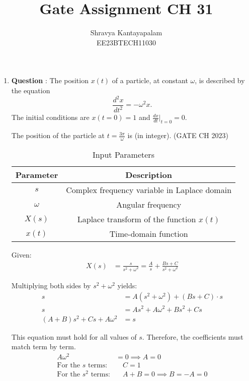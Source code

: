 \documentclass[journal,12pt,twocolumn]{IEEEtran}
\theoremstyle{remark}
\begin{document}
\title{Gate Assignment CH 31}
\author{Shravya Kantayapalam\\ EE23BTECH11030}
\maketitle

\begin{enumerate}
    \item \textbf{Question }:
The position \( x(t) \) of a particle, at constant \( \omega \), is described by the equation
\[
\frac{{d^2x}}{{dt^2}} = -\omega^2 x.
\]
The initial conditions are \( x(t=0) = 1 \) and \( \frac{{dx}}{{dt}}\bigg|_{t=0} = 0 \). 

The position of the particle at \( t = \frac{{3\pi}}{{\omega}} \) is \underline{\hspace{2cm}} (in integer).
\hfill{(GATE CH 2023)}

\solution

\begin{table}[htbp]
    \centering
    \caption{Input Parameters}
    \begin{tabular}{|c|c|}
        \hline
        \textbf{Parameter} & \textbf{Description} \\
        \hline
        $s$ & Complex frequency variable in Laplace domain \\
        $\omega$ & Angular frequency \\
        $X(s)$ & Laplace transform of the function $x(t)$ \\
        $x(t)$ & Time-domain function \\
        \hline
    \end{tabular}
\end{table}

Given:
\begin{align*}
X(s) &= \frac{s}{s^2 + \omega^2} = \frac{A}{s} + \frac{Bs + C}{s^2 + \omega^2}
\end{align*}

Multiplying both sides by \( s^2 + \omega^2 \) yields:
\begin{align*}
s &= A(s^2 + \omega^2) + (Bs + C) \cdot s \\
s &= As^2 + A\omega^2 + Bs^2 + Cs \\
(A + B)s^2 + Cs + A\omega^2 &= s
\end{align*}

This equation must hold for all values of \( s \). Therefore, the coefficients must match term by term.
\begin{align*}
A\omega^2 &= 0 \implies A = 0 \\
\text{For the } s \text{ terms:} &\quad C = 1 \\
\text{For the } s^2 \text{ terms:} &\quad A + B = 0 \implies B = -A = 0
\end{align*}


\end{enumerate}
\end{document}
